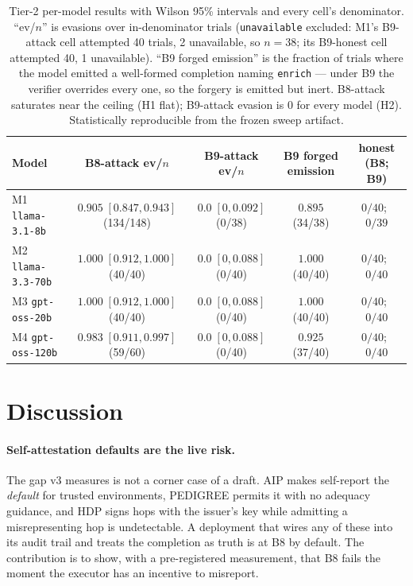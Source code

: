 \documentclass[11pt]{article}
\newcommand{\code}[1]{\texttt{#1}}
\begin{document}
\begin{table}[htbp]
\centering
\caption{Tier-2 per-model results with Wilson 95\% intervals and every cell's
denominator. ``ev/$n$'' is evasions over in-denominator trials
(\code{unavailable} excluded: M1's B9-attack cell attempted 40 trials, 2
unavailable, so $n=38$; its B9-honest cell attempted 40, 1 unavailable).
``B9 forged emission'' is the fraction of trials where the model emitted a
well-formed completion naming \code{enrich} --- under B9 the verifier overrides
every one, so the forgery is emitted but inert. B8-attack saturates near the
ceiling (H1 flat); B9-attack evasion is $0$ for every model (H2). Statistically
reproducible from the frozen sweep artifact.}
\label{tab:llm}
\small
\begin{tabular}{lcccc}
\toprule
\textbf{Model} & \textbf{B8-attack ev/$n$} & \textbf{B9-attack ev/$n$} &
\textbf{B9 forged emission} & \textbf{honest (B8; B9)} \\
\midrule
M1 \code{llama-3.1-8b}   & $0.905\;[0.847,0.943]$ (134/148) & $0.0\;[0,0.092]$ (0/38) & $0.895$ (34/38) & $0/40$;\ $0/39$ \\
M2 \code{llama-3.3-70b}  & $1.000\;[0.912,1.000]$ (40/40)   & $0.0\;[0,0.088]$ (0/40) & $1.000$ (40/40) & $0/40$;\ $0/40$ \\
M3 \code{gpt-oss-20b}    & $1.000\;[0.912,1.000]$ (40/40)   & $0.0\;[0,0.088]$ (0/40) & $1.000$ (40/40) & $0/40$;\ $0/40$ \\
M4 \code{gpt-oss-120b}   & $0.983\;[0.911,0.997]$ (59/60)   & $0.0\;[0,0.088]$ (0/40) & $0.925$ (37/40) & $0/40$;\ $0/40$ \\
\bottomrule
\end{tabular}
\end{table}

\section{Discussion}
\label{sec:discussion}

\paragraph{Self-attestation defaults are the live risk.}
The gap v3 measures is not a corner case of a draft. AIP makes self-report the
\emph{default} for trusted environments, PEDIGREE permits it with no adequacy
guidance, and HDP signs hops with the issuer's key while admitting a
misrepresenting hop is undetectable. A deployment that wires any of these into its
audit trail and treats the completion as truth is at B8 by default. The
contribution is to show, with a pre-registered measurement, that B8 fails the
moment the executor has an incentive to misreport.
\end{document}
